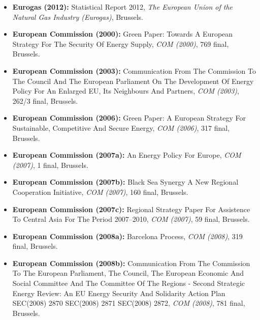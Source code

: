 \documentclass[11pt,a4paper,english]{scrreprt}
\begin{document}
\begin{itemize}
	\item [\Rectsteel] \textbf{Eurogas (2012):} Statistical Report 2012,
\textsl{The European Union of the Natural Gas Industry (Eurogas)}, Brussels.



	\item [\Rectsteel] \textbf{European Commission (2000):} Green Paper:
Towards A European Strategy For The Security Of Energy Supply, \textsl{COM
(2000)}, 769 final, Brussels.



	\item [\Rectsteel] \textbf{European Commission (2003):} Communication
From The Commission To The Council And The European Parliament On The
Development Of Energy Policy For An Enlarged EU, Its Neighbours And Partners,
\textsl{COM (2003)}, 262/3 final, Brussels.



	\item [\Rectsteel] \textbf{European Commission (2006):} Green Paper:
A European Strategy For Sustainable, Competitive And Secure Energy, \textsl{COM
(2006)}, 317 final, Brussels.



	\item [\Rectsteel] \textbf{European Commission (2007a):} An Energy
Policy For Europe, \textsl{COM (2007)}, 1 final, Brussels.



	\item [\Rectsteel] \textbf{European Commission (2007b):} Black Sea
Synergy \textemdash{} A New Regional Cooperation Initiative, \textsl{COM
(2007)}, 160 final, Brussels.



	\item [\Rectsteel] \textbf{European Commission (2007c):} Regional
Strategy Paper For Assistence To Central Asia For The Period 2007--2010,
\textsl{COM (2007)}, 59 final, Brussels.



	\item [\Rectsteel] \textbf{European Commission (2008a):} Barcelona
Process, \textsl{COM (2008)}, 319 final, Brussels.



	\item [\Rectsteel] \textbf{European Commission (2008b):} Communication
From The Commission To The European Parliament, The Council, The European
Economic And Social Committee And The Committee Of The Regions - Second
Strategic Energy Review: An EU Energy Security And Solidarity Action Plan
{SEC(2008) 2870} {SEC(2008) 2871} {SEC(2008) 2872}, \textsl{COM (2008)}, 781
final, Brussels.




\end{itemize}
\end{document}
